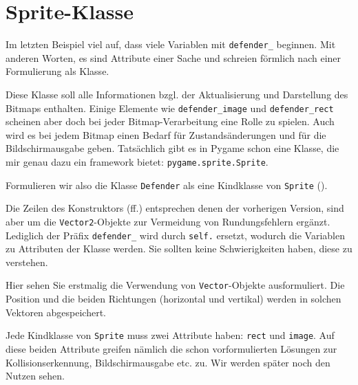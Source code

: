 \newpage
\section{Sprite-Klasse}
Im letzten Beispiel viel auf, dass viele Variablen mit \texttt{defender\_} beginnen. Mit anderen Worten, es sind Attribute einer Sache und schreien förmlich nach einer Formulierung als Klasse. 

Diese Klasse soll alle Informationen bzgl. der Aktualisierung und Darstellung des Bitmaps enthalten. Einige Elemente wie \texttt{defender\_image} und \texttt{defender\_rect} scheinen aber doch bei jeder Bitmap-Verarbeitung eine Rolle zu spielen. Auch wird es bei jedem Bitmap einen Bedarf für Zustandsänderungen und für die Bildschirmausgabe geben. Tatsächlich gibt es in Pygame schon eine Klasse, die mir genau dazu ein \Gls{framework} bietet: \texttt{pygame.sprite.Sprite}. 

Formulieren wir also die Klasse \texttt{Defender} als eine Kindklasse von \texttt{Sprite} ().


Die Zeilen des Konstruktors (ff.) entsprechen denen der vorherigen Version, sind aber um die \texttt{Vector2}-Objekte zur Vermeidung von Rundungsfehlern ergänzt. Lediglich der Präfix \texttt{defender\_} wird durch \texttt{self.} ersetzt, wodurch die Variablen zu Attributen der Klasse werden. Sie sollten keine Schwierigkeiten haben, diese zu verstehen.

Hier sehen Sie erstmalig die Verwendung von \texttt{Vector}-Objekte ausformuliert. Die Position und die beiden Richtungen (horizontal und vertikal) werden in solchen Vektoren abgespeichert.

Jede Kindklasse von \texttt{Sprite} muss zwei Attribute haben: \texttt{rect} und \texttt{image}. Auf diese beiden Attribute greifen nämlich die schon vorformulierten Lösungen zur Kollisionserkennung, Bildschirmausgabe etc. zu. Wir werden später noch den Nutzen sehen.

